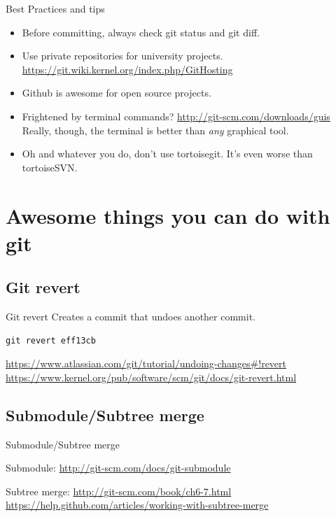 \documentclass[10pt,a4paper]{beamer}
\begin{document}
\begin{frame}[fragile]{Best Practices and tips}
\begin{itemize}
\item Before committing, always check git status and git diff.
\pause
\item Use private repositories for university projects.
\href{http://git-scm.com/downloads/guis}{\color{blue}https://git.wiki.kernel.org/index.php/GitHosting}
\item Github is awesome for open source projects.
\pause
\item Frightened by terminal commands?
\href{http://git-scm.com/downloads/guis}{\color{blue}http://git-scm.com/downloads/guis} \\
Really, though, the terminal is better than \textit{any} graphical tool.
\pause
\item Oh and whatever you do, don't use tortoisegit. It's even worse than tortoiseSVN.
\end{itemize}
\end{frame}


\section{Awesome things you can do with git}

\subsection{Git revert}
\begin{frame}[fragile]{Git revert}
Creates a commit that undoes another commit.
\begin{verbatim}git revert eff13cb\end{verbatim}
\href{https://www.atlassian.com/git/tutorial/undoing-changes#!revert}{\color{blue}https://www.atlassian.com/git/tutorial/undoing-changes\#!revert}
\href{https://www.kernel.org/pub/software/scm/git/docs/git-revert.html}{\color{blue}https://www.kernel.org/pub/software/scm/git/docs/git-revert.html}

\end{frame}

\subsection{Submodule/Subtree merge}
\begin{frame}{Submodule/Subtree merge}

Submodule:
\href{http://git-scm.com/docs/git-submodule}{\color{blue}http://git-scm.com/docs/git-submodule}

Subtree merge:
\href{http://git-scm.com/book/ch6-7.html}{\color{blue}http://git-scm.com/book/ch6-7.html}
\href{https://help.github.com/articles/working-with-subtree-merge}{\color{blue}https://help.github.com/articles/working-with-subtree-merge}
\end{frame}
\end{document}
